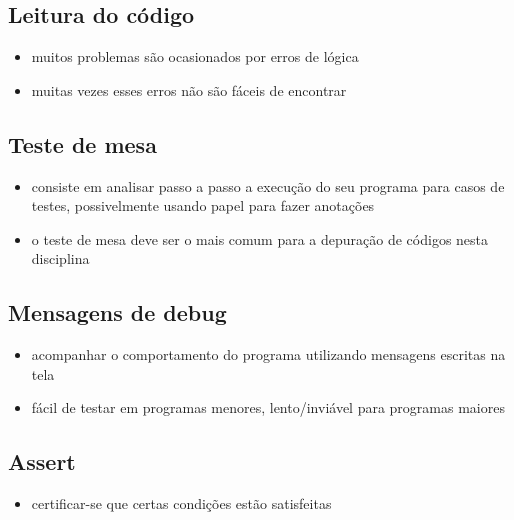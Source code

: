 \documentclass[portuguese,10pt,xcolor=table]{bredelebeamer}
\begin{document}
	\begin{frame}[c]
		\begin{center}
		\end{center}
	\end{frame} 

	\subsection{Leitura do código}
	\begin{frame}
		\begin{itemize}
			\item muitos problemas são ocasionados por erros de lógica
			
			\item muitas vezes esses erros não são fáceis de encontrar
		\end{itemize}
	\end{frame}

	\subsection{Teste de mesa}
	\begin{frame}
		\begin{itemize}
			\item consiste em analisar passo a passo a execução do seu programa para casos de testes, possivelmente usando papel para fazer anotações
			

		\item o teste de mesa deve ser o mais comum para a depuração de códigos nesta disciplina
		\end{itemize}
	\end{frame}

	\subsection{Mensagens de debug}
	\begin{frame}
		\begin{itemize}
		\item acompanhar o comportamento do programa utilizando mensagens escritas na tela
			
		\item fácil de testar em programas menores, lento/inviável para programas maiores
		\end{itemize}
	\end{frame}

	\subsection{Assert}
	\begin{frame}
		\begin{itemize}
			\item certificar-se que certas condições estão satisfeitas
			

		\end{itemize}
	\end{frame}
	
\end{document}
